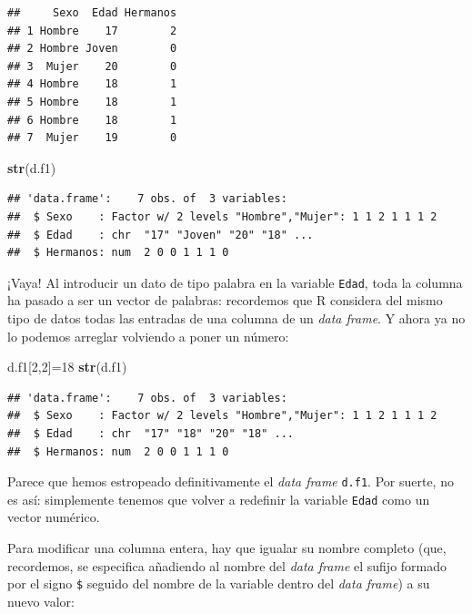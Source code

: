 \documentclass[]{book}
\newenvironment{Shaded}{\begin{snugshade}}{\end{snugshade}}
\newcommand{\DecValTok}[1]{\textcolor[rgb]{0.00,0.00,0.81}{#1}}
\newcommand{\KeywordTok}[1]{\textcolor[rgb]{0.13,0.29,0.53}{\textbf{#1}}}
\newcommand{\NormalTok}[1]{#1}
\theoremstyle{definition}
\theoremstyle{definition}
\theoremstyle{definition}
\theoremstyle{remark}
\begin{document}
\begin{verbatim}
##     Sexo  Edad Hermanos
## 1 Hombre    17        2
## 2 Hombre Joven        0
## 3  Mujer    20        0
## 4 Hombre    18        1
## 5 Hombre    18        1
## 6 Hombre    18        1
## 7  Mujer    19        0
\end{verbatim}

\begin{Shaded}
\begin{Highlighting}[]
\KeywordTok{str}\NormalTok{(d.f1)}
\end{Highlighting}
\end{Shaded}

\begin{verbatim}
## 'data.frame':    7 obs. of  3 variables:
##  $ Sexo    : Factor w/ 2 levels "Hombre","Mujer": 1 1 2 1 1 1 2
##  $ Edad    : chr  "17" "Joven" "20" "18" ...
##  $ Hermanos: num  2 0 0 1 1 1 0
\end{verbatim}

¡Vaya! Al introducir un dato de tipo palabra en la variable \texttt{Edad}, toda la columna ha pasado a ser un vector de palabras: recordemos que R considera del mismo tipo de datos todas las entradas de una columna de un \emph{data frame}. Y ahora ya no lo podemos arreglar volviendo a poner un número:

\begin{Shaded}
\begin{Highlighting}[]
\NormalTok{d.f1[}\DecValTok{2}\NormalTok{,}\DecValTok{2}\NormalTok{]=}\DecValTok{18}
\KeywordTok{str}\NormalTok{(d.f1)}
\end{Highlighting}
\end{Shaded}

\begin{verbatim}
## 'data.frame':    7 obs. of  3 variables:
##  $ Sexo    : Factor w/ 2 levels "Hombre","Mujer": 1 1 2 1 1 1 2
##  $ Edad    : chr  "17" "18" "20" "18" ...
##  $ Hermanos: num  2 0 0 1 1 1 0
\end{verbatim}

Parece que hemos estropeado definitivamente el \emph{data frame} \texttt{d.f1}. Por suerte, no es así: simplemente tenemos que volver a redefinir la variable \texttt{Edad} como un vector numérico.

Para modificar una columna entera, hay que igualar su nombre completo (que, recordemos, se especifica añadiendo al nombre del \emph{data frame} el sufijo formado por el signo \texttt{\$} seguido del nombre de la variable dentro del \emph{data frame}) a su nuevo valor:
\end{document}
